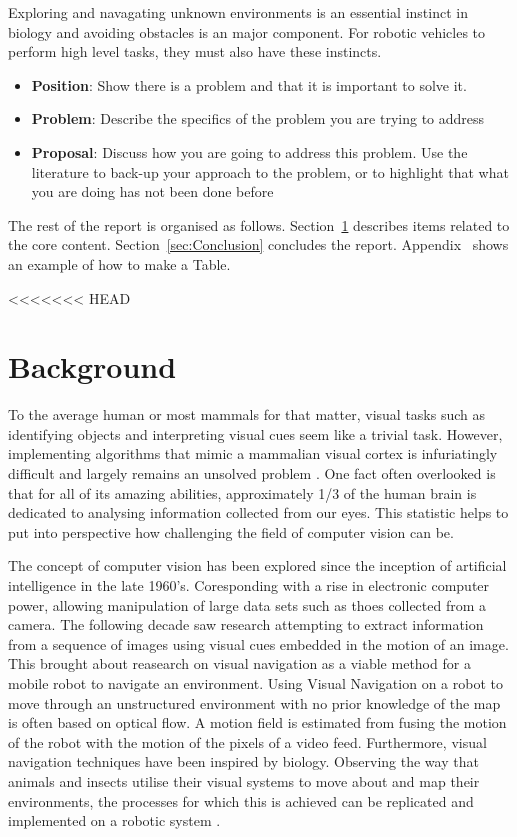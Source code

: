 \documentclass{UoNMCHA}
\numberwithin{equation}{section}
\begin{document}
Exploring and navagating unknown environments is an essential instinct in biology and avoiding obstacles is an major component. For robotic vehicles to perform high level tasks, they must also have these instincts.

\begin{itemize}
    \item \textbf{Position}: Show there is a problem and that it is important to solve it.
    \item \textbf{Problem}: Describe the specifics of the problem you are trying to address
    \item \textbf{Proposal}: Discuss how you are going to address this problem. Use the literature to back-up your approach to the problem, or to highlight that what you are doing has not been done before
\end{itemize}

The rest of the report is organised as follows. Section~\ref{sec:Background} describes items related to the core content. Section~\ref{sec:Conclusion} concludes the report. Appendix~ shows an example of how to make a Table.

<<<<<<< HEAD
\newpage
\section{Background}\label{sec:Background}
To the average human or most mammals for that matter, visual tasks such as identifying objects and interpreting visual cues seem like a trivial task. However, implementing algorithms that mimic a mammalian visual cortex is infuriatingly difficult and largely remains an unsolved problem \citep{hartley2003multiple}. One fact often overlooked is that for all of its amazing abilities, approximately 1/3 of the human brain is dedicated to analysing information collected from our eyes. This statistic helps to put into perspective how challenging the field of computer vision can be.

The concept of computer vision has been explored since the inception of artificial intelligence in the late 1960’s. Coresponding with a rise in electronic computer power, allowing manipulation of large data sets such as thoes collected from a camera. The following decade saw research attempting to extract information from a sequence of images using visual cues embedded in the motion of an image. This brought about reasearch on visual navigation as a viable method for a mobile robot to navigate an environment. Using Visual Navigation on a robot to move through an unstructured environment with no prior knowledge of the map is often based on optical flow. A motion field is estimated from fusing the motion of the robot with the motion of the pixels of a video feed. Furthermore, visual navigation techniques have been inspired by biology. Observing the way that animals and insects utilise their visual systems to move about and map their environments, the processes for which this is achieved can be replicated and implemented on a robotic system \citep{altshuler2018comparison}.
\end{document}
